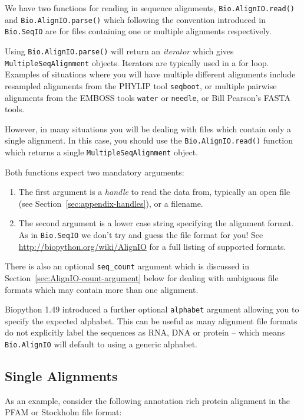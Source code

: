 \documentclass{report}
\begin{document}
We have two functions for reading in sequence alignments, \verb|Bio.AlignIO.read()| and \verb|Bio.AlignIO.parse()| which following the convention introduced in \verb|Bio.SeqIO| are for files containing one or multiple alignments respectively.

Using \verb|Bio.AlignIO.parse()| will return an {\it iterator} which gives \verb|MultipleSeqAlignment| objects.  Iterators are typically used in a for loop.  Examples of situations where you will have multiple different alignments include resampled alignments from the PHYLIP tool \verb|seqboot|, or multiple pairwise alignments from the EMBOSS tools \verb|water| or \verb|needle|, or Bill Pearson's FASTA tools.

However, in many situations you will be dealing with files which contain only a single alignment.  In this case, you should use the \verb|Bio.AlignIO.read()| function which returns a single \verb|MultipleSeqAlignment| object.

Both functions expect two mandatory arguments:

\begin{enumerate}
\item The first argument is a {\it handle} to read the data from, typically an open file (see Section~\ref{sec:appendix-handles}), or a filename.
\item The second argument is a lower case string specifying the alignment format.  As in \verb|Bio.SeqIO| we don't try and guess the file format for you!  See \url{http://biopython.org/wiki/AlignIO} for a full listing of supported formats.
\end{enumerate}

\noindent There is also an optional \verb|seq_count| argument which is discussed in Section~\ref{sec:AlignIO-count-argument} below for dealing with ambiguous file formats which may contain more than one alignment.

Biopython 1.49 introduced a further optional \verb|alphabet| argument allowing you to specify the expected alphabet. This can be useful as many alignment file formats do not explicitly label the sequences as RNA, DNA or protein -- which means \verb|Bio.AlignIO| will default to using a generic alphabet.

\subsection{Single Alignments}
As an example, consider the following annotation rich protein alignment in the PFAM or Stockholm file format:
\end{document}
